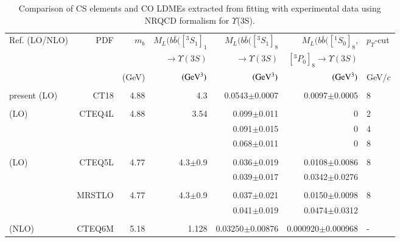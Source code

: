 \begin{table}
  \centering
  \caption{Comparison of CS elements and CO LDMEs extracted from fitting with experimental data
    using NRQCD formalism for $\Upsilon$(3S).}
  \footnotesize
  \begin{tabular*}{\textwidth}{@{\extracolsep{\fill}}lrrrrrl@{}}
    \hline
    \hline
    Ref. (LO/NLO) &PDF & $m_b$ & $M_L(b\bar{b}([^3S_1]_1$ & $M_L(b\bar{b}([^3S_1]_8$ & 
    $M_L(b\bar{b}([^1S_0]_8$, & $p_T$-cut \\
    & & & $\rightarrow\Upsilon(3S)$ & $\rightarrow\Upsilon(3S)$ & $[^3P_0]_8\rightarrow\Upsilon(3S)$ & \\
    & & (GeV) & $({\rm GeV^3})$ & $({\rm GeV^3})$ & $({\rm GeV^3})$ & GeV/$c$ \\
    \hline
    \hline
    & & & & & & \\
    present (LO) & CT18 &4.88 &4.3 & 0.0543$\pm$0.0007 & 0.0097$\pm$0.0005 & 8   \\
    & & & & & & \\
    \cite{Domenech:2000ri} (LO) & CTEQ4L & 4.88 & 3.54 & 0.099$\pm$0.011 & 0 & 2 \\
    & & & & 0.091$\pm$0.015 & 0 & 4 \\
    & & & & 0.068$\pm$0.011 & 0 & 8 \\
    & & & & & & \\
    \cite{Brateen:PRD2001} (LO) & CTEQ5L & 4.77 & 4.3$\pm$0.9 & 0.036$\pm$0.019 & 0.0108$\pm$0.0086 & 8 \\
    & & & & 0.039$\pm$0.017 & 0.0342$\pm$0.0276 & \\
    & & & & & & \\
    & MRSTLO & 4.77 & 4.3$\pm$0.9 & 0.037$\pm$0.021 & 0.0150$\pm$0.0098 & 8 \\
    & & & & 0.041$\pm$0.019 & 0.0474$\pm$0.0312 & \\
    & & & & & & \\
    \cite{Gong:2010bk} (NLO) & CTEQ6M & 5.18 & 1.128 & 0.03250$\pm$0.00876 & 0.000920$\pm$0.000968 & -\\

\end{tabular*}
\end{table}
